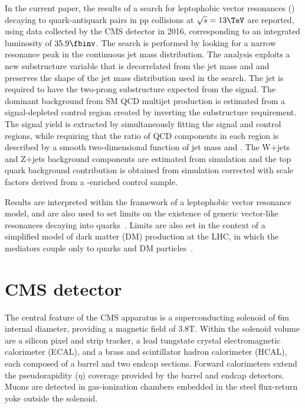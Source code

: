\documentclass[11pt,twoside,a4paper,cmspaper,final,collab]{cms-tdr}
\begin{document}
In the current paper, the results of a search for leptophobic vector 
resonances (\PZpr) decaying to quark-antiquark pairs in pp collisions at
$\sqrt{s} = 13\TeV$ are reported, using data collected by the CMS detector in 2016, 
corresponding to an integrated luminosity of $35.9\fbinv$.
The search is performed by looking for a narrow resonance peak in the
continuous jet mass distribution.
The analysis exploits a new substructure variable that is decorrelated from the jet mass
and \pt and preserves the shape of the jet mass distribution used in the search. 
The jet is required to have the two-prong substructure expected from the signal.
The dominant background
from SM QCD multijet production is estimated from a signal-depleted control
region created by inverting the substructure requirement.  The signal
yield is extracted by simultaneously fitting the signal and control
regions, while requiring that the ratio of QCD components in each region is
described by a smooth two-dimensional function of jet mass and \pt. 
The W+jets and Z+jets background components are estimated
from simulation and the top quark background contribution is obtained from simulation 
corrected with scale factors derived from a \ttbar-enriched control sample.

Results are interpreted within the framework of a leptophobic vector
resonance model, and are also used to set limits on the existence of
generic vector-like resonances decaying into
quarks~\cite{Dobrescu:2013coa}.  
Limits are also set in the context of a simplified model 
of dark matter (DM) production at the LHC, 
in which the mediators couple only to quarks and DM particles~\cite{Abercrombie:2015wmb}.
\label{sec:intro}

\section{CMS detector}

The central feature of the CMS apparatus is a superconducting solenoid
of 6\unit{m} internal diameter, providing a magnetic field of
3.8\unit{T}. Within the solenoid volume are a silicon
pixel and strip tracker, a lead tungstate crystal electromagnetic
calorimeter (ECAL), and a brass and scintillator hadron calorimeter
(HCAL), each composed of a barrel and two endcap sections. Forward
calorimeters extend the pseudorapidity ($\eta$)
coverage provided by the barrel and endcap detectors. Muons are
detected in gas-ionization chambers embedded in the steel flux-return
yoke outside the solenoid.  
\end{document}
